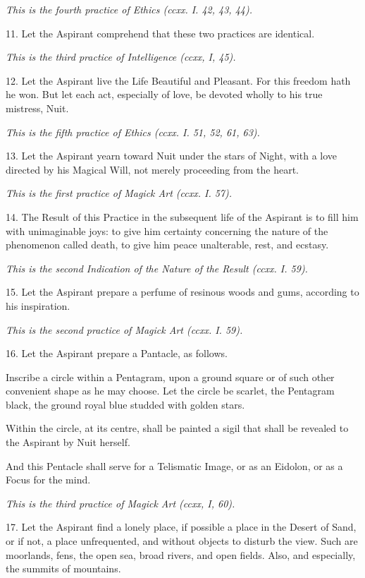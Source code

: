 \textit{This is the fourth practice of Ethics (ccxx. I. 42, 43, 44).}

11. Let the Aspirant comprehend that these two practices are identical.

\textit{This is the third practice of Intelligence (ccxx, I, 45).}

12. Let the Aspirant live the Life Beautiful and Pleasant. For this freedom hath he won. But let each act, especially of love, be devoted wholly to his true mistress, Nuit.

\textit{This is the fifth practice of Ethics (ccxx. I. 51, 52, 61, 63).}

13. Let the Aspirant yearn toward Nuit under the stars of Night, with a love directed by his Magical Will, not merely proceeding from the heart.

\textit{This is the first practice of Magick Art (ccxx. I. 57).}

14. The Result of this Practice in the subsequent life of the Aspirant is to fill him with unimaginable joys: to give him certainty concerning the nature of the phenomenon called death, to give him peace unalterable, rest, and ecstasy.

\textit{This is the second Indication of the Nature of the Result (ccxx. I. 59).}

15. Let the Aspirant prepare a perfume of resinous woods and gums, according to his inspiration.

\textit{This is the second practice of Magick Art (ccxx. I. 59).}

16. Let the Aspirant prepare a Pantacle, as follows.

Inscribe a circle within a Pentagram, upon a ground square or of such other convenient shape as he may choose. Let the circle be scarlet, the Pentagram black, the ground royal blue studded with golden stars.

Within the circle, at its centre, shall be painted a sigil that shall be revealed to the Aspirant by Nuit herself.

And this Pentacle shall serve for a Telismatic Image, or as an Eidolon, or as a Focus for the mind.

\textit{This is the third practice of Magick Art (ccxx, I, 60).}

17. Let the Aspirant find a lonely place, if possible a place in the Desert of Sand, or if not, a place unfrequented, and without objects to disturb the view. Such are moorlands, fens, the open sea, broad rivers, and open fields. Also, and especially, the summits of mountains.

